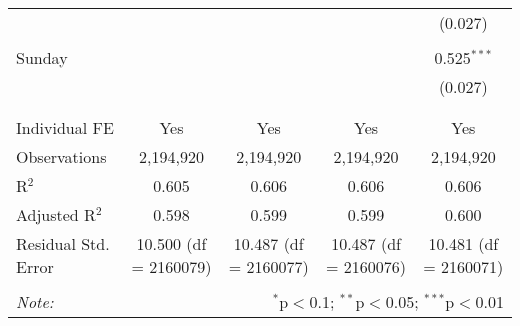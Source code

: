 \documentclass[
]{article}
\begin{document}
\begin{table}[!htbp]
{\begin{tabular}{@{\extracolsep{5pt}}lcccc}
  &  &  &  & (0.027) \\ 
  & & & & \\ 
 Sunday &  &  &  & 0.525$^{***}$ \\ 
  &  &  &  & (0.027) \\ 
  & & & & \\ 
\hline \\[-1.8ex] 
Individual FE & Yes & Yes & Yes & Yes \\ 
Observations & 2,194,920 & 2,194,920 & 2,194,920 & 2,194,920 \\ 
R$^{2}$ & 0.605 & 0.606 & 0.606 & 0.606 \\ 
Adjusted R$^{2}$ & 0.598 & 0.599 & 0.599 & 0.600 \\ 
Residual Std. Error & 10.500 (df = 2160079) & 10.487 (df = 2160077) & 10.487 (df = 2160076) & 10.481 (df = 2160071) \\ 
\hline 
\hline \\[-1.8ex] 
\textit{Note:}  & \multicolumn{4}{r}{$^{*}$p$<$0.1; $^{**}$p$<$0.05; $^{***}$p$<$0.01} \\ 
\end{tabular}
} 
\end{table} 
\newpage
\end{document}
